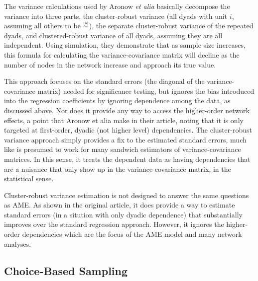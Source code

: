 The variance calculations used by Aronow \textit{et alia} basically decompose the variance into three parts, the cluster-robust variance (all dyads with unit $i$, assuming all others to be $\simiid$), the separate cluster-robust variance of the repeated dyads, and clustered-robust variance of all dyads, assuming they are all independent.  Using simulation, they demonstrate that as sample size increases, this formula for calculating the variance-covariance matrix will decline as the number of nodes in the network increase and approach its true value.  

This approach focuses on the standard errors (the diagonal of the variance-covariance matrix) needed for significance testing, but ignores the bias introduced into the regression coefficients by ignoring dependence among the data, as discussed above.  Nor does it provide any way to access the higher-order network effects, a point that Aronow et alia make in their article, noting that it is only targeted at first-order, dyadic (not higher level) dependencies. The cluster-robust variance approach simply provides a fix to the estimated standard errors, much like is presumed to work for many sandwich estimators of variance-covariance matrices.  In this sense, it treats the dependent data as having dependencies that are a nuisance that only show up in the variance-covariance matrix, in the statistical sense.

Cluster-robust variance estimation is not designed to answer the same questions as AME.  As shown in the original article, it does provide a way to  estimate standard errors (in a sitution with only dyadic dependence) that substantially improves over the standard regression approach.  However, it ignores the higher-order dependencies which are the focus of the AME model and many network analyses.  




\subsection*{Choice-Based Sampling}

